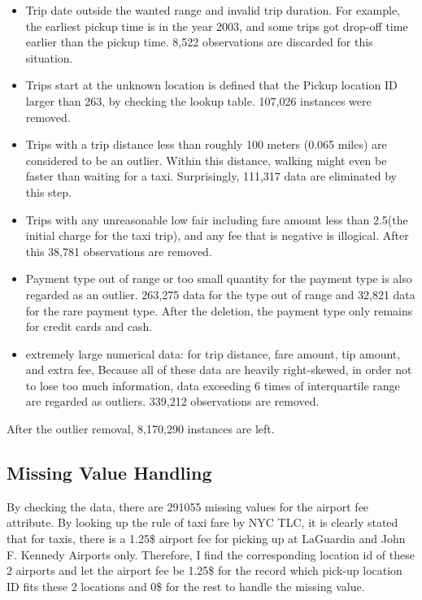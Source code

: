 \documentclass[11pt]{article}
\begin{document}
\begin{itemize} 
    \item Trip date outside the wanted range and invalid trip duration. For example, the earliest pickup time is in the year 2003, and some trips got drop-off time earlier than the pickup time. 8,522 observations are discarded for this situation.
    \item Trips start at the unknown location is defined that the Pickup location ID larger than 263, by checking the lookup table. 107,026 instances were removed.
    \item Trips with a trip distance less than roughly 100 meters (0.065 miles) are considered to be an outlier. Within this distance, walking might even be faster than waiting for a taxi. Surprisingly, 111,317 data are eliminated by this step.
    \item Trips with any unreasonable low fair including fare amount less than 2.5(the initial charge for the taxi trip), and any fee that is negative is illogical. After this 38,781 observations are removed.
    \item Payment type out of range or too small quantity for the payment type is also regarded as an outlier. 263,275 data for the type out of range and 32,821 data for the rare payment type. After the deletion, the payment type only remains for credit cards and cash.
    \item extremely large numerical data: for trip distance, fare amount, tip amount, and extra fee, Because all of these data are heavily right-skewed, in order not to lose too much information, data exceeding 6 times of interquartile range are regarded as outliers. 339,212 observations are removed.
\end{itemize} 
After the outlier removal, 8,170,290 instances are left.

\subsection{Missing Value Handling}
By checking the data, there are 291055 missing values for the airport fee attribute. By looking up the rule of taxi fare by NYC TLC, it is clearly stated that for taxis, there is a 1.25\$ airport fee for picking up at LaGuardia and John F. Kennedy Airports only. Therefore, I find the corresponding location id of these 2 airports and let the airport fee be 1.25\$ for the record which pick-up location ID fits these 2 locations and 0\$ for the rest to handle the missing value.
\end{document}
